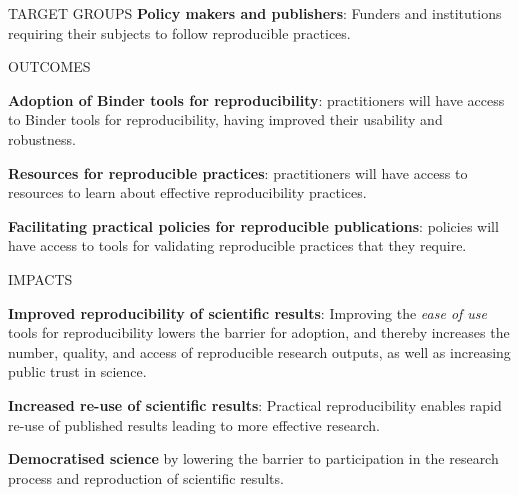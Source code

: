 \begin{multicols}{2}
\begin{summarybox}{TARGET GROUPS}
\textbf{Policy makers and publishers}: Funders and institutions requiring their subjects to follow reproducible practices.
\end{summarybox}

\begin{summarybox}{OUTCOMES}

\textbf{Adoption of Binder tools for reproducibility}:
practitioners will have access to Binder tools for reproducibility,
having improved their usability and robustness.

\textbf{Resources for reproducible practices}:
practitioners will have access to resources to learn about effective reproducibility practices.

\textbf{Facilitating practical policies for reproducible publications}:
policies will have access to tools for validating reproducible practices that they require.
\end{summarybox}

\begin{summarybox}{IMPACTS}

\textbf{Improved reproducibility of scientific results}: Improving the \emph{ease of use} tools for reproducibility
lowers the barrier for adoption, and thereby increases the number, quality, and
access of reproducible research outputs, as well as increasing public trust in science.

\textbf{Increased re-use of scientific results}: Practical reproducibility
enables rapid re-use of published results leading to more effective research.

\textbf{Democratised science} by lowering the barrier to participation in the research process
and reproduction of scientific results.

\end{summarybox}
\end{multicols}
\clearpage

%

%




